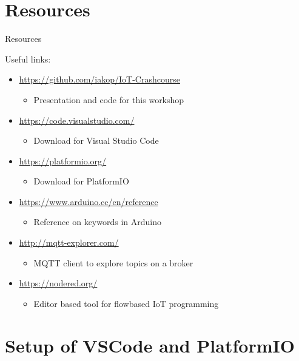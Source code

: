 \documentclass[aspectratio=169]{beamer}
\begin{document}
\section{Resources}
\begin{frame}{Resources}
	\begin{textBox}
	Useful links:
		\begin{itemize}
			\item \url{https://github.com/iakop/IoT-Crashcourse}
			\begin{itemize}
				\item Presentation and code for this workshop
			\end{itemize}
			\item \url{https://code.visualstudio.com/}
			\begin{itemize}
				\item Download for Visual Studio Code
			\end{itemize}
			\item \url{https://platformio.org/}
			\begin{itemize}
				\item Download for PlatformIO
			\end{itemize}
			\item \url{https://www.arduino.cc/en/reference}
			\begin{itemize}
				\item Reference on keywords in Arduino
			\end{itemize}
			\item \url{http://mqtt-explorer.com/}
			\begin{itemize}
				\item MQTT client to explore topics on a broker
			\end{itemize}
			\item \url{https://nodered.org/}
			\begin{itemize}
				\item Editor based tool for flowbased IoT programming
			\end{itemize}
		\end{itemize}
	\end{textBox}
\end{frame}

\section{Setup of VSCode and PlatformIO}
\begin{frame}
\end{frame}
\end{document}
